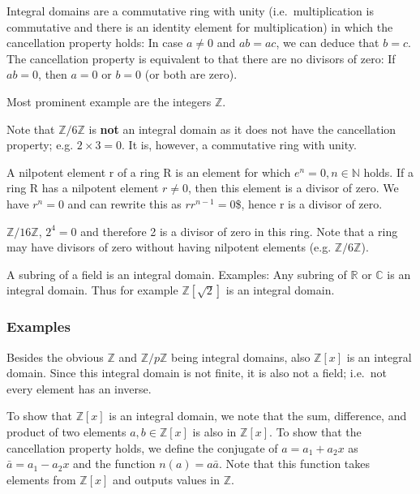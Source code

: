 
Integral domains are a commutative ring with unity (i.e.~multiplication
is commutative and there is an identity element for multiplication) in
which the cancellation property holds: In case \(a \neq 0\) and
\(ab = ac\), we can deduce that \(b=c\). The cancellation property is
equivalent to that there are no divisors of zero: If \(ab=0\), then
\(a=0\) or \(b=0\) (or both are zero).

Most prominent example are the integers \(\mathbb{Z}\).

Note that \(\mathbb{Z}/6\mathbb{Z}\) is \textbf{not} an integral domain
as it does not have the cancellation property; e.g. \(2 \times 3=0\). It
is, however, a commutative ring with unity.

A nilpotent element r of a ring R is an element for which
\(e^n=0, n \in \mathbb{N}\) holds. If a ring R has a nilpotent element
\(r \neq 0\), then this element is a divisor of zero. We have \(r^n=0\)
and can rewrite this as \(r r^{n-1}=0\)\$, hence r is a divisor of zero.

\(\mathbb{Z}/16\mathbb{Z}\), \(2^4=0\) and therefore 2 is a divisor of
zero in this ring. Note that a ring may have divisors of zero without
having nilpotent elements (e.g. \(\mathbb{Z}/6\mathbb{Z}\)).

A subring of a field is an integral domain. Examples: Any subring of
\(\mathbb{R}\) or \(\mathbb{C}\) is an integral domain. Thus for example
\(\mathbb{Z}[\sqrt{2}]\) is an integral domain.

\subsubsection{Examples}\label{examples}

Besides the obvious \(\mathbb{Z}\) and \(\mathbb{Z}/p \mathbb{Z}\) being
integral domains, also \(\mathbb{Z}[x]\) is an integral domain. Since
this integral domain is not finite, it is also not a field; i.e.~not
every element has an inverse.

To show that \(\mathbb{Z}[x]\) is an integral domain, we note that the
sum, difference, and product of two elements \(a, b \in \mathbb{Z}[x]\)
is also in \(\mathbb{Z}[x]\). To show that the cancellation property
holds, we define the conjugate of \(a=a_1+a_2x\) as
\(\bar{a} = a_1-a_2x\) and the function \(n(a) = a \bar{a}\). Note that
this function takes elements from \(\mathbb{Z}[x]\) and outputs values
in \(\mathbb{Z}\).

